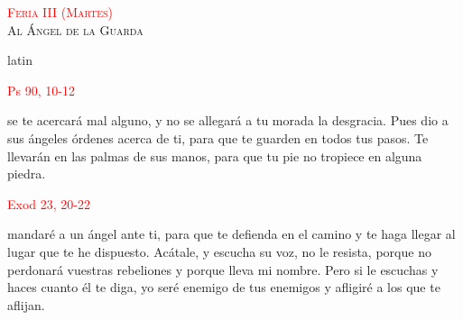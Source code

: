 \documentclass[10pt]{article}
\begin{document}
\begin{multicols}{2}
      \begin{otherlanguage}{latin}
            

            \vspace{1mm}

            
      \end{otherlanguage}


      \begin{center}
            \textsc{\textcolor{red}{Feria III (Martes)}\\ {\large Al Ángel de la Guarda}}
      \end{center}

      \begin{otherlanguage*}{latin}
            
      \end{otherlanguage*}

      \vspace{2mm}

      \hfill\textcolor{red}{Ps 90, 10-12}

      se te acercará mal alguno, y no se allegará a tu morada la desgracia. Pues dio a sus ángeles órdenes acerca de ti, para que te guarden en todos tus pasos.
      Te llevarán en las palmas de sus manos, para que tu pie no tropiece en alguna piedra.
      
      \vspace{2mm}

      \hfill\textcolor{red}{Exod 23, 20-22}
      
      mandaré a un ángel ante ti, para que te defienda en el camino y te haga llegar al lugar que te he dispuesto. Acátale, y escucha su voz,
      no le resista, porque no perdonará vuestras rebeliones y porque lleva mi nombre. Pero si le escuchas y haces cuanto él te diga, yo seré
      enemigo de tus enemigos y afligiré a los que te aflijan.
      
      \vspace{2mm}

      
      \vspace{2mm}


\end{multicols}
\end{document}
